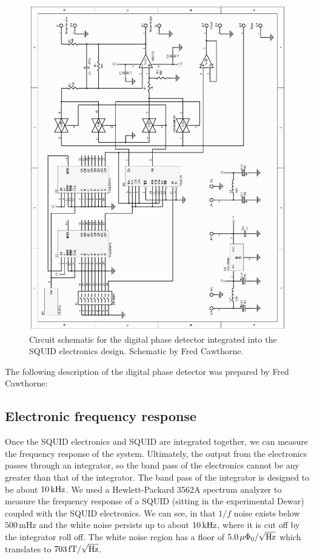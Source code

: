 \begin{figure}
\includegraphics[width=5.7in]{figs/appendixA/dpdschematicmod.ps}
\caption[Circuit schematic for SQUID electronics digital phase detector.]
{Circuit schematic for the digital phase detector integrated into the
SQUID electronics design. Schematic by Fred Cawthorne.}
\label{fig:digital_phase_scheme}
\end{figure}

The following description of the digital phase detector was 
prepared by Fred Cawthorne:


\subsection{Electronic frequency response}

Once the SQUID electronics and SQUID are integrated together, we 
can measure the frequency response of the system. Ultimately, the 
output from the electronics passes through an integrator, so the 
band pass of the electronics cannot be any greater than that of the 
integrator. The band pass of the integrator is designed to be 
about $10\,\mathrm{kHz}$. We used a Hewlett-Packard 3562A
spectrum analyzer\cite{HP}
to measure the frequency response of a SQUID (sitting in the 
experimental Dewar) coupled with the 
SQUID electronics. 
We can see, in  
that $1/f$ noise exists below $500\,\mathrm{mHz}$
and the white noise persists up to about
$10\,\mathrm{kHz}$, where it is cut off by the integrator roll off. The 
white noise region has a floor of $5.0\,\mu\Phi_0/\sqrt{\mathrm{Hz}}$
which translates to $703\,\mathrm{fT}/\sqrt{\mathrm{Hz}}$. 

